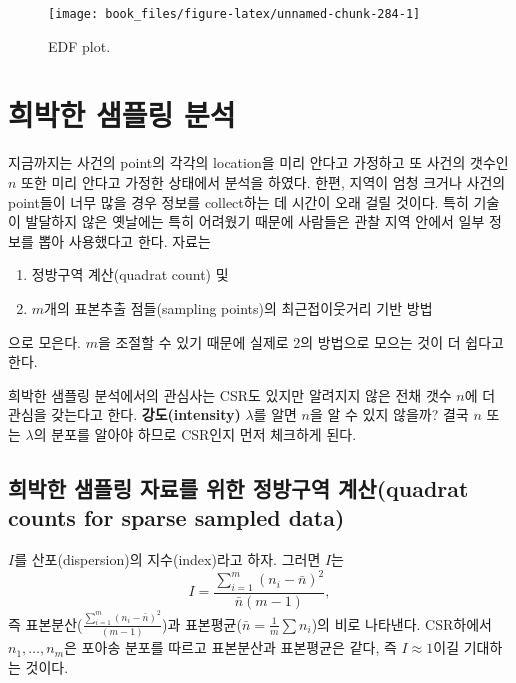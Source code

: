 \documentclass[b5paper,]{scrbook}
\theoremstyle{plain}
\theoremstyle{definition}
\numberwithin{equation}{section}
\begin{document}
\begin{figure}

{\centering \texttt{[image: book\_files/figure-latex/unnamed-chunk-284-1]} 

}

\caption{EDF plot.}\label{fig:unnamed-chunk-284}
\end{figure}

\chapter{희박한 샘플링 분석}\label{sparsesampling}

지금까지는 사건의 point의 각각의 location을 미리 안다고 가정하고 또
사건의 갯수인 \(n\) 또한 미리 안다고 가정한 상태에서 분석을 하였다.
한편, 지역이 엄청 크거나 사건의 point들이 너무 많을 경우 정보를
collect하는 데 시간이 오래 걸릴 것이다. 특히 기술이 발달하지 않은
옛날에는 특히 어려웠기 때문에 사람들은 관찰 지역 안에서 일부 정보를 뽑아
사용했다고 한다. 자료는

\begin{enumerate}
\def\labelenumi{\arabic{enumi}.}
\item
  정방구역 계산(quadrat count) 및
\item
  \(m\)개의 표본추출 점들(sampling points)의 최근접이웃거리 기반 방법
\end{enumerate}

으로 모은다. \(m\)을 조절할 수 있기 때문에 실제로 2의 방법으로 모으는
것이 더 쉽다고 한다.

희박한 샘플링 분석에서의 관심사는 CSR도 있지만 알려지지 않은 전채 갯수
\(n\)에 더 관심을 갖는다고 한다. \textbf{강도(intensity)} \(\lambda\)를
알면 \(n\)을 알 수 있지 않을까? 결국 \(n\) 또는 \(\lambda\)의 분포를
알아야 하므로 CSR인지 먼저 체크하게 된다.

\section{희박한 샘플링 자료를 위한 정방구역 계산(quadrat counts for
sparse sampled data)}\label{-----quadrat-counts-for-sparse-sampled-data}

\(I\)를 산포(dispersion)의 지수(index)라고 하자. 그러면 \(I\)는
\[I=\frac{\sum_{i=1}^{m}(n_{i}-\bar{n})^{2}}{\bar{n}(m-1)},\] 즉
표본분산(\(\frac{\sum_{i=1}^{m}(n_{i}-\bar{n})^{2}}{(m-1)}\))과
표본평균(\(\bar{n}=\frac{1}{m}\sum n_{i}\))의 비로 나타낸다. CSR하에서
\(n_{1}, \ldots, n_{m}\)은 포아송 분포를 따르고 표본분산과 표본평균은
같다, 즉 \(I \approx 1\)이길 기대하는 것이다.
\end{document}
